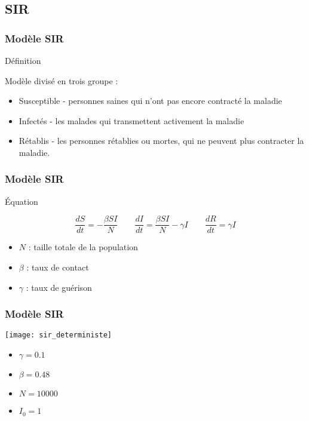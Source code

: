 \subsection{SIR}

\begin{frame}
        \frametitle{Modèle SIR}

        \begin{block}{Définition}

                Modèle divisé en trois groupe :
                \begin{itemize}
                        \item Susceptible - personnes saines qui n'ont pas encore contracté la maladie
                        \item Infectés - les malades qui transmettent activement la maladie
                        \item Rétablis - les personnes rétablies ou mortes, qui ne peuvent plus contracter la maladie.
                \end{itemize}

        \end{block}
\end{frame}

\begin{frame}
        \frametitle{Modèle SIR}

        \begin{alertblock}{Équation}

                $$ \frac{dS}{dt} = -\frac{\beta SI}{N} \qquad \frac{dI}{dt} = \frac{\beta SI}{N} - \gamma I \qquad \frac{dR}{dt} = \gamma I $$

                \begin{itemize}
                        \item $N$ : taille totale de la population
                        \item $\beta$ : taux de contact
                        \item $\gamma$ : taux de guérison
                \end{itemize}

        \end{alertblock}
\end{frame}

\begin{frame}
        \frametitle{Modèle SIR}

        \centering
        \texttt{[image: sir\_deterministe]}

        \begin{multicols}{2}
                \begin{itemize}
                        \item $\gamma = 0.1$
                        \item $\beta = 0.48$
                        \item $N = 10000$
                        \item $I_0 = 1$
                \end{itemize}
        \end{multicols}

\end{frame}

